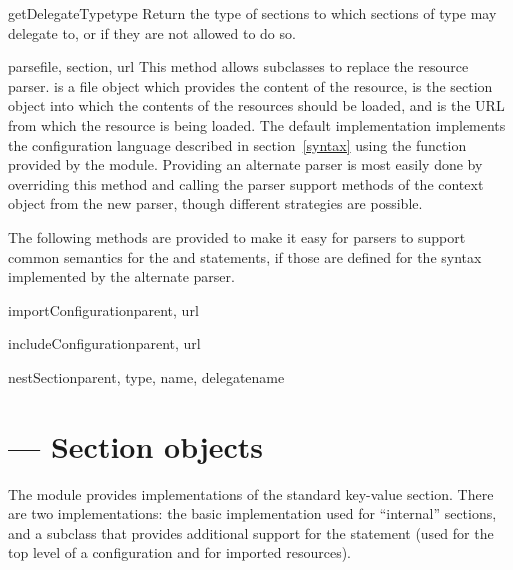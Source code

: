 \documentclass{howto}
\begin{document}
\begin{methoddesc}{getDelegateType}{type}
  Return the type of sections to which sections of type  may
  delegate to, or  if they are not allowed to do so.
\end{methoddesc}

\begin{methoddesc}{parse}{file, section, url}
  This method allows subclasses to replace the resource parser.
   is a file object which provides the content of the
  resource,  is the section object into which the
  contents of the resources should be loaded, and  is the URL
  from which the resource is being loaded.  The default implementation
  implements the configuration language described in
  section~\ref{syntax} using the  function provided
  by the  module.  Providing an
  alternate parser is most easily done by overriding this method and
  calling the parser support methods of the context object from the
  new parser, though different strategies are possible.
\end{methoddesc}

The following methods are provided to make it easy for parsers to
support common semantics for the  and
 statements, if those are defined for the syntax
implemented by the alternate parser.

\begin{methoddesc}{importConfiguration}{parent, url}
\end{methoddesc}

\begin{methoddesc}{includeConfiguration}{parent, url}
\end{methoddesc}

\begin{methoddesc}{nestSection}{parent, type, name, delegatename}
\end{methoddesc}


\section{ --- Section objects}



The  module provides implementations of the
standard key-value section.  There are two implementations: the basic
implementation used for ``internal'' sections, and a subclass that
provides additional support for the  statement (used
for the top level of a configuration and for imported resources).
\end{document}
